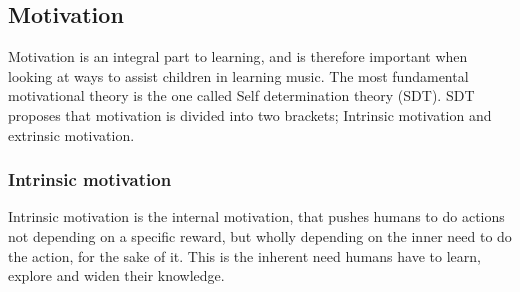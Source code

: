 \subsection{Motivation}
Motivation is an integral part to learning\cite{motivationGameDesign}, and is therefore important when looking at ways to assist children in learning music. The most fundamental motivational theory is the one called Self determination theory (SDT)\cite{SDT}. SDT proposes that motivation is divided into two brackets; Intrinsic motivation and extrinsic motivation\cite{SDT}. 

\subsubsection*{Intrinsic motivation}\label{sec:intrinsic}
Intrinsic motivation is the internal motivation, that pushes humans to do actions not depending on a specific reward, but wholly depending on the inner need to do the action, for the sake of it\cite{SDT}.
This is the inherent need humans have to learn, explore and widen their knowledge\cite{SDT}.\\

